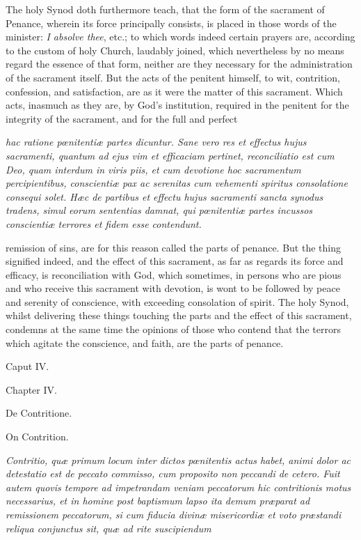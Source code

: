 The holy Synod doth furthermore teach, that the form of the sacrament of Penance, wherein its force principally consists, is placed in those words of the minister: \emph{I absolve thee}, etc.; to which words indeed certain prayers are, according to the custom of holy Church, laudably joined, which nevertheless by no means regard the essence of that form, neither are they necessary for the administration of the sacrament itself. But the acts of the penitent himself, to wit, contrition, confession, and satisfaction, are as it were the matter of this sacrament. Which acts, inasmuch as they are, by God's institution, required in the penitent for the integrity of the sacrament, and for the full and perfect

\emph{hac ratione pœnitentiæ partes dicuntur. Sane vero res et effectus hujus sacramenti, quantum ad ejus vim et efficaciam pertinet, reconciliatio est cum Deo, quam interdum in viris piis, et cum devotione hoc sacramentum percipientibus, conscientiæ pax ac serenitas cum vehementi spiritus consolatione consequi solet. Hæc de partibus et effectu hujus sacramenti sancta synodus tradens, simul eorum sententias damnat, qui pœnitentiæ partes incussos conscientiæ terrores et fidem esse contendunt.}

remission of sins, are for this reason called the parts of penance. But the thing signified indeed, and the effect of this sacrament, as far as regards its force and efficacy, is reconciliation with God, which sometimes, in persons who are pious and who receive this sacrament with devotion, is wont to be followed by peace and serenity of conscience, with exceeding consolation of spirit. The holy Synod, whilst delivering these things touching the parts and the effect of this sacrament, condemns at the same time the opinions of those who contend that the terrors which agitate the conscience, and faith, are the parts of penance.

Caput IV.

Chapter IV.

De Contritione.

On Contrition.

\emph{Contritio, quæ primum locum inter dictos pœnitentis actus habet, animi dolor ac detestatio est de peccato commisso, cum proposito non peccandi de cetero. Fuit autem quovis tempore ad impetrandam veniam peccatorum hic contritionis motus necessarius, et in homine post baptismum lapso ita demum præparat ad remissionem peccatorum, si cum fiducia divinæ misericordiæ et voto præstandi reliqua conjunctus sit, quæ ad rite suscipiendum }

